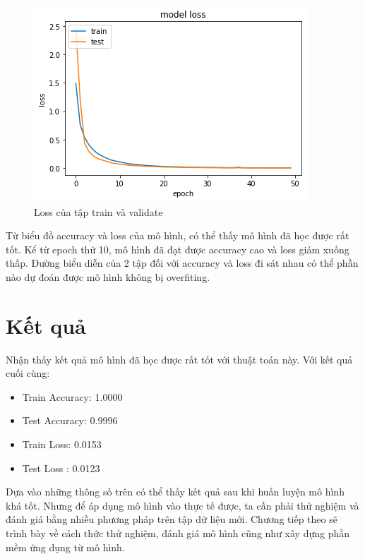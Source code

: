 \FloatBarrier
\begin{figure}[htp]
\begin{center}
\includegraphics[scale=1]{chap4/c4_figs/train_val_l.png}
\end{center}
\caption{Loss của tập train và validate}
\label{fig:pipelineS}
\end{figure}
\FloatBarrier

Từ biểu đồ accuracy và loss của mô hình, có thể thấy mô hình đã học được rất tốt. Kể từ epoch thứ 10, mô hình đã đạt được accuracy cao và loss giảm xuống thấp. Đường biểu diễn của 2 tập đối với accuracy và loss đi sát nhau có thể phần nào dự đoán được mô hình không bị overfiting. 

\section{Kết quả}

Nhận thấy kết quả mô hình đã học được rất tốt với thuật toán này. Với kết quả cuối cùng:
\begin{itemize}
\item Train Accuracy: 1.0000
\item Test Accuracy: 0.9996
\item Train Loss: 0.0153
\item Test Loss    : 0.0123
\end{itemize}

Dựa vào những thông số trên có thể thấy kết quả sau khi huấn luyện mô hình khá tốt. Nhưng để áp dụng mô hình vào thực tế được, ta cần phải thử nghiệm và đánh giá bằng nhiều phương pháp trên tập dữ liệu mới. Chương tiếp theo sẽ trình bày về cách thức thử nghiệm, đánh giá mô hình cũng như xây dựng phần mềm ứng dụng từ mô hình. 
















